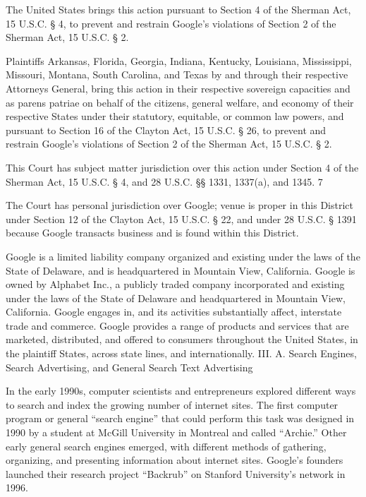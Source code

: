 \documentclass[11pt,b5paper]{scrartcl}
\begin{document}

The United States brings this action pursuant to Section 4 of the Sherman Act,
15 U.S.C. § 4, to prevent and restrain Google’s violations of Section 2 of the Sherman Act,
15 U.S.C. § 2.


Plaintiffs Arkansas, Florida, Georgia, Indiana, Kentucky, Louisiana, Mississippi,
Missouri, Montana, South Carolina, and Texas by and through their respective Attorneys
General, bring this action in their respective sovereign capacities and as parens patriae on behalf
of the citizens, general welfare, and economy of their respective States under their statutory,
equitable, or common law powers, and pursuant to Section 16 of the Clayton Act,
15 U.S.C. § 26, to prevent and restrain Google’s violations of Section 2 of the Sherman Act,
15 U.S.C. § 2.


This Court has subject matter jurisdiction over this action under Section 4 of the
Sherman Act, 15 U.S.C. § 4, and 28 U.S.C. §§ 1331, 1337(a), and 1345.
7


The Court has personal jurisdiction over Google; venue is proper in this District
under Section 12 of the Clayton Act, 15 U.S.C. § 22, and under 28 U.S.C. § 1391 because
Google transacts business and is found within this District.


Google is a limited liability company organized and existing under the laws of the
State of Delaware, and is headquartered in Mountain View, California. Google is owned by
Alphabet Inc., a publicly traded company incorporated and existing under the laws of the State of
Delaware and headquartered in Mountain View, California. Google engages in, and its activities
substantially affect, interstate trade and commerce. Google provides a range of products and
services that are marketed, distributed, and offered to consumers throughout the United States, in
the plaintiff States, across state lines, and internationally.
III.
A.
Search Engines, Search Advertising, and General Search Text Advertising


In the early 1990s, computer scientists and entrepreneurs explored different ways
to search and index the growing number of internet sites. The first computer program or general
“search engine” that could perform this task was designed in 1990 by a student at McGill
University in Montreal and called “Archie.” Other early general search engines emerged, with
different methods of gathering, organizing, and presenting information about internet sites.
Google’s founders launched their research project “Backrub” on Stanford University’s network
in 1996.
\end{document}
